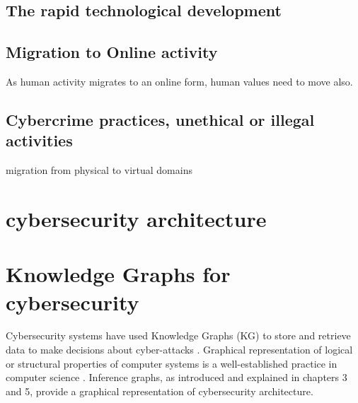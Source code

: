 \subsection {The rapid technological development}

\subsection  {Migration to Online activity}

As human activity migrates to an online form, human values need to move also.
 
\subsection {Cybercrime practices, unethical or illegal activities}

migration from physical to virtual domains

\section{ cybersecurity architecture}
\cite{Rerup2018}
\section{Knowledge Graphs for cybersecurity}
Cybersecurity systems have used Knowledge Graphs (KG) to store and  retrieve data  to make decisions about cyber-attacks 
\iffalse 
We believe that improving the base cyber threat intelligence representation will help improve the overall quality and performance of systems. The dependence of various cybersecurity informatics systems on various knowledge representation schemes makes it imperative that we develop systems that improve these representations. In some cases, a knowledge graph can have incorrect relationships between two cybersecurity entities, or may not even assert a relationship or a few missing relationships. In such a case, we can say that there are a few missing of relationships. we improve knowledge graphs by validating relationships and asserting values for missing relationships \fi \cite{pingle2019relext,jia2018practical, ghose2019multimodal, deng2019knowledge}. Graphical representation of logical or structural properties of computer systems is a well-established practice in computer science \cite{engelen2010integrating}. Inference graphs, as introduced and explained in chapters 3 and 5, provide a graphical representation of cybersecurity architecture.

